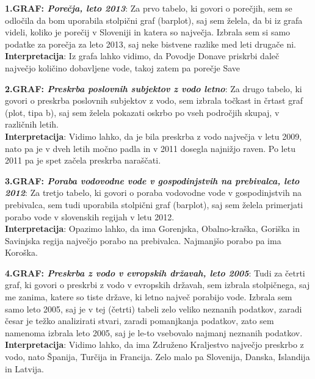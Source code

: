 \documentclass[11pt,a4paper]{article}
\begin{document}
\textbf{1.GRAF: \emph{Porečja, leto 2013}}: Za prvo tabelo, ki govori o porečjih, sem se odločila da bom uporabila stolpični graf (barplot), saj sem želela, da bi iz grafa videli, koliko je porečij v Sloveniji in katera so največja. Izbrala sem si samo podatke za porečja za leto 2013, saj neke bistvene razlike med leti drugače ni.\\
\textbf{Interpretacija}: Iz grafa lahko vidimo, da Povodje Donave priskrbi daleč največjo količino dobavljene vode, takoj zatem pa porečje Save


\newpage
\textbf{2.GRAF: \emph{Preskrba poslovnih subjektov z vodo letno}}: Za drugo tabelo, ki govori o preskrba poslovnih subjektov z vodo, sem izbrala točkast in črtast graf (plot, tipa b), saj sem želela pokazati oskrbo po vseh področjih skupaj, v različnih letih.\\
\textbf{Interpretacija}: Vidimo lahko, da je bila preskrba z vodo največja v letu 2009, nato pa je v dveh letih močno padla in v 2011 dosegla najnižjo raven. Po letu 2011 pa je spet začela preskrba naraščati.\\


\newpage
\textbf{3.GRAF: \emph{Poraba vodovodne vode v gospodinjstvih na prebivalca, leto 2012}}: Za tretjo tabelo, ki govori o poraba vodovodne vode v gospodinjstvih na prebivalca, sem tudi uporabila stolpični graf (barplot), saj sem želela primerjati porabo vode v slovenskih regijah v letu 2012. \\
\textbf{Interpretacija}: Opazimo lahko, da ima Gorenjska, Obalno-kraška, Goriška in Savinjska regija največjo porabo na prebivalca. Najmanjšo porabo pa ima Koroška.\\


\newpage
\textbf{4.GRAF: \emph{Preskrba z vodo v evropskih državah, leto 2005}}: Tudi za četrti graf, ki govori o preskrbi z vodo v evropskih državah, sem izbrala stolpičnega, saj me zanima, katere so tiste države, ki letno največ porabijo vode. Izbrala sem samo leto 2005, saj je v tej (četrti) tabeli zelo veliko neznanih podatkov, zaradi česar je težko analizirati stvari, zaradi pomanjkanja podatkov, zato sem namenoma izbrala leto 2005, saj je le-to vsebovalo najmanj neznanih podatkov.\\
\textbf{Interpretacija}: Vidimo lahko, da ima Združeno Kraljestvo največjo preskrbo z vodo, nato Španija, Turčija in Francija. Zelo malo pa Slovenija, Danska, Islandija in Latvija.\\
\end{document}

